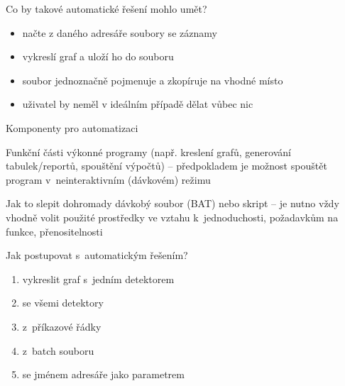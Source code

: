 \documentclass{beamer}
\begin{document}
\begin{frame}{Co by takové automatické řešení mohlo umět?}
  \begin{itemize}
    \item načte z daného adresáře soubory se záznamy
    \item vykreslí graf a uloží ho do souboru
    \item soubor jednoznačně pojmenuje a zkopíruje na vhodné místo
    \item uživatel by neměl v ideálním případě dělat vůbec nic
  \end{itemize}
\end{frame}

\begin{frame}{Komponenty pro automatizaci}
  \begin{block}{Funkční části}
    výkonné programy (např. kreslení grafů, generování tabulek/reportů, spouštění výpočtů) -- předpokladem je možnost spouštět program v~neinteraktivním (dávkovém) režimu
  \end{block}
  \pause
  \begin{block}{Jak to slepit dohromady}
    dávkobý soubor (BAT) nebo skript -- je nutno vždy vhodně volit použité prostředky ve vztahu k~jednoduchosti, požadavkům na funkce, přenositelnosti
  \end{block}
\end{frame}

\begin{frame}{Jak postupovat s~automatickým řešením?}
  \begin{enumerate}
    \item vykreslit graf s~jedním detektorem
    \pause
    \item se všemi detektory
    \pause
    \item z~příkazové řádky
    \pause
    \item z~batch souboru
    \pause
    \item se jménem adresáře jako parametrem
  \end{enumerate}
\end{frame}
\end{document}
